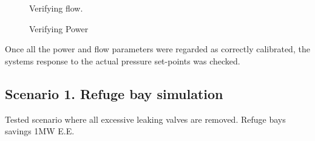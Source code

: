 	\begin{figure}[h]
		\centering
		\fbox{}
		\caption{Verifying flow.}
		\label{fig: Verification flow kusasalethu}
	\end{figure}
	\begin{figure}[h]
		\centering
		\fbox{}
		\caption{Verifying Power}
		\label{fig: Verification Power kusasalethu}
	\end{figure}
	Once all the power and flow parameters were regarded as correctly calibrated, the systems response to the actual pressure set-points was checked.
	
	\subsection{Scenario 1. Refuge bay simulation}
	Tested scenario where all excessive leaking valves are removed.
	Refuge bays savings 1MW E.E.
	
